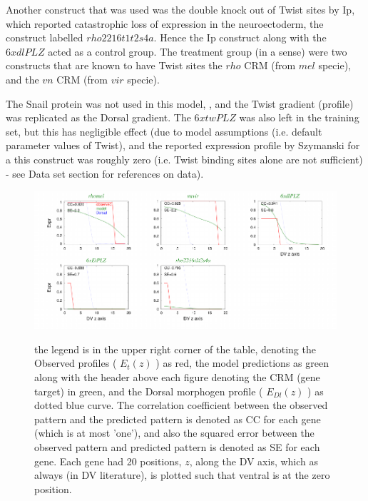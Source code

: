 Another construct that was used was the double knock out of Twist sites by Ip, which reported catastrophic loss of expression in the neuroectoderm, the construct labelled $rho2216t1t2s4a$.  Hence the Ip construct along with the $6xdlPLZ$ acted as a control group.  The treatment group (in a sense) were two constructs that are known to have Twist sites the $rho$ CRM (from $mel$ specie), and the $vn$ CRM (from $vir$ specie).
 
The Snail protein was not used in this model, , and the Twist gradient (profile) was replicated as the Dorsal gradient.  The $6xtwPLZ$ was also left in the training set, but this has negligible effect (due to model assumptions (i.e. default parameter values of Twist), and the reported expression profile by Szymanski for a this construct was roughly zero (i.e. Twist binding sites alone are not sufficient) - see Data set section for references on data).
\begin{figure}
  \includegraphics[width=1\textwidth]{DInosnail.pdf}\\
  \caption{the legend is in the upper right corner of the table, denoting the Observed profiles ( $E_t(z)$ ) as red, the model predictions as green along with the header above each figure denoting the CRM (gene target) in green, and the Dorsal morphogen profile  ( $E_{Dl}(z)$ ) as dotted blue curve.  The correlation coefficient between the observed pattern and the predicted pattern is denoted as CC for each gene (which is at most 'one'), and also the squared error between the observed pattern and predicted pattern is denoted as SE for each gene.  Each gene had 20 positions, $z$, along the DV axis, which as always (in DV literature), is plotted such that ventral is at the zero position.  }\label{roughfit}
\end{figure}



